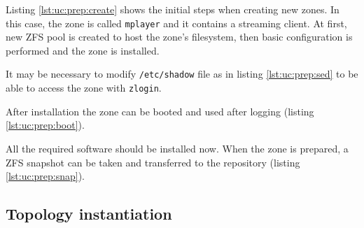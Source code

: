 \documentclass[11pt]{book}
\begin{document}
        Listing \ref{lst:uc:prep:create} shows the initial steps when creating new zones. In this case, the zone is
        called \texttt{mplayer} and it contains a streaming client. At first, new ZFS pool is created to host the zone's
        filesystem, then basic configuration is performed and the zone is installed. \\

        \noindent
        \begin{minipage}{\textwidth}
          
        \end{minipage}

        \noindent
        It may be necessary to modify \texttt{/etc/shadow} file as in listing \ref{lst:uc:prep:sed} to be able to access
        the zone with \texttt{zlogin}. \\

        \noindent
        \begin{minipage}{\textwidth}
          
        \end{minipage}

        \noindent
        After installation the zone can be booted and used after logging (listing \ref{lst:uc:prep:boot}). \\

        \noindent
        \begin{minipage}{\textwidth}
          
        \end{minipage}

        \noindent
        All the required software should be installed now. When the zone is prepared, a ZFS snapshot can be taken and
        transferred to the repository (listing \ref{lst:uc:prep:snap}). \\

        \noindent
        \begin{minipage}{\textwidth}
          
        \end{minipage}


      \subsection{Topology instantiation}
      \label{ssub:}
\end{document}
